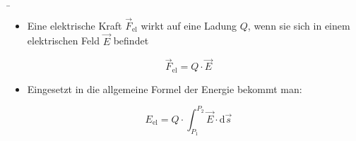 \begin{frame}[t]
\b{
  \begin{itemize}
    \item Eine elektrische Kraft $\vec{F}_\mathrm{el}$ wirkt auf eine Ladung $Q$, wenn sie sich in einem elektrischen Feld $\vec{E}$ befindet
  \end{itemize}
	\begin{equation*}
			\vec{F}_\mathrm{{el}} = Q \cdot \vec{E}
	\end{equation*}
	\begin{itemize}
    \item Eingesetzt in die allgemeine Formel der Energie bekommt man:
  \end{itemize}
	\begin{equation*}
			E_\mathrm{el} = Q \cdot \int_{P_\mathrm{1}}^{P_\mathrm{2}} \vec{E} \cdot \mathrm{d}\vec{s}
	\end{equation*}


}
\end{frame}
